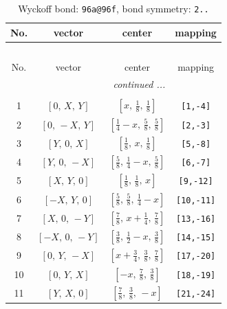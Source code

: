 \documentclass[fleqn,8pt]{jsarticle}
\begin{document}
\begin{longtable}{cccc}
\caption{Wyckoff bond: {\tt 96a@96f}, bond symmetry: {\tt 2..}}
 \\
 \hline \hline
No. & vector & center & mapping \\ \hline \endfirsthead

\multicolumn{3}{l}{\tablename\ \thetable{}} \\
 \hline \hline
No. & vector & center & mapping \\ \hline \endhead

 \hline \hline
\multicolumn{3}{r}{\footnotesize\it continued ...} \\ \endfoot

 \hline \hline
\multicolumn{3}{r}{} \\ \endlastfoot

1 & $\left[ 0,\, X,\, Y \right]$ & $\left[ x,\, \frac{1}{8},\, \frac{1}{8} \right]$ & {\tt [1,-4]} \\ \hline
2 & $\left[ 0,\, - X,\, Y \right]$ & $\left[ \frac{1}{4} - x,\, \frac{5}{8},\, \frac{5}{8} \right]$ & {\tt [2,-3]} \\ \hline
3 & $\left[ Y,\, 0,\, X \right]$ & $\left[ \frac{1}{8},\, x,\, \frac{1}{8} \right]$ & {\tt [5,-8]} \\ \hline
4 & $\left[ Y,\, 0,\, - X \right]$ & $\left[ \frac{5}{8},\, \frac{1}{4} - x,\, \frac{5}{8} \right]$ & {\tt [6,-7]} \\ \hline
5 & $\left[ X,\, Y,\, 0 \right]$ & $\left[ \frac{1}{8},\, \frac{1}{8},\, x \right]$ & {\tt [9,-12]} \\ \hline
6 & $\left[ - X,\, Y,\, 0 \right]$ & $\left[ \frac{5}{8},\, \frac{5}{8},\, \frac{1}{4} - x \right]$ & {\tt [10,-11]} \\ \hline
7 & $\left[ X,\, 0,\, - Y \right]$ & $\left[ \frac{7}{8},\, x + \frac{1}{4},\, \frac{7}{8} \right]$ & {\tt [13,-16]} \\ \hline
8 & $\left[ - X,\, 0,\, - Y \right]$ & $\left[ \frac{3}{8},\, \frac{1}{2} - x,\, \frac{3}{8} \right]$ & {\tt [14,-15]} \\ \hline
9 & $\left[ 0,\, Y,\, - X \right]$ & $\left[ x + \frac{3}{4},\, \frac{3}{8},\, \frac{7}{8} \right]$ & {\tt [17,-20]} \\ \hline
10 & $\left[ 0,\, Y,\, X \right]$ & $\left[ - x,\, \frac{7}{8},\, \frac{3}{8} \right]$ & {\tt [18,-19]} \\ \hline
11 & $\left[ Y,\, X,\, 0 \right]$ & $\left[ \frac{7}{8},\, \frac{3}{8},\, - x \right]$ & {\tt [21,-24]} \\ \hline

\end{longtable}
\end{document}
